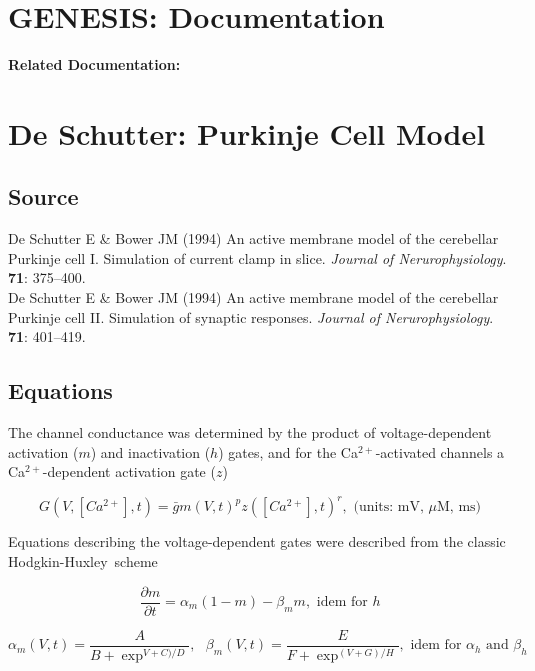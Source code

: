 \documentclass[12pt]{article}
\begin{document}
\section*{GENESIS: Documentation}

{\bf Related Documentation:}

\section*{De Schutter: Purkinje Cell Model}

\subsection*{Source}

De Schutter E \& Bower JM (1994) An active membrane model of the cerebellar Purkinje cell I. Simulation of current clamp in slice. {\it Journal of Nerurophysiology}. {\bf 71}: 375--400. \\
De Schutter E \& Bower JM (1994) An active membrane model of the cerebellar Purkinje cell II. Simulation of synaptic responses.  {\it Journal of Nerurophysiology}. {\bf 71}: 401--419.

\subsection*{Equations}

The channel conductance was
determined by the product of voltage-dependent activation ($m$)
and inactivation ($h$) gates, and for the Ca$^{2+}$-activated channels
a Ca$^{2+}$-dependent activation gate ($z$)

\begin{equation}
   G(V,[Ca^{2+}], t) = \bar gm(V, t)^p z([Ca^{2+}], t)^r, \mbox{        (units: mV, $\mu$M, ms)}
\end{equation}

Equations describing the voltage-dependent gates were described from the classic Hodgkin-Huxley\,\cite{L:1952fv} scheme

\begin{equation}
   \frac{\partial m}{\partial t} = \alpha_m(1-m) - \beta_mm, \mbox{        idem for $h$}
\end{equation}

\begin{equation}
   \alpha_m(V,t) = \frac{A}{B+\exp^{V+C)/D}}, \mbox{        }\beta_m(V,t) = \frac{E}{F+\exp^{(V+G)/H}}, \mbox{        idem for $\alpha_h$ and $\beta_h$}
\end{equation}
\end{document}
